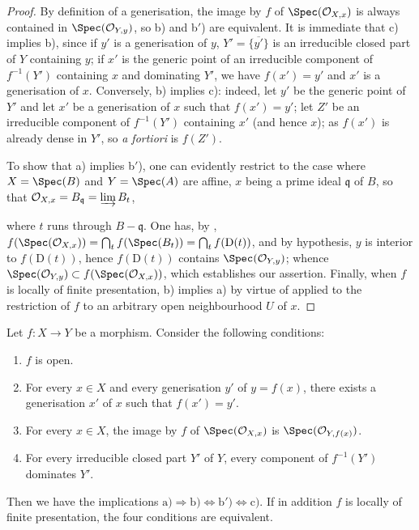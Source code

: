 
\begin{proof}
By definition of a generisation, the image by $f$ of $\Spec(\mathcal{O}_{X,x})$ is always contained in $\Spec(\mathcal{O}_{Y,y})$, so b) and b$'$) are equivalent.
It is immediate that c) implies b), since if $y'$ is a generisation of $y$, $Y'=\overline{\{y'\}}$ is an irreducible closed part of $Y$ containing $y$; if $x'$ is the generic point of an irreducible component of $f^{-1}(Y')$ containing $x$ and dominating $Y'$, we have $f(x')=y'$  and $x'$ is a generisation of $x$.
Conversely, b) implies c): indeed, let $y'$ be the generic point of $Y'$ and let $x'$ be a generisation of $x$ such that $f(x')=y'$; let $Z'$ be an irreducible component of $f^{-1}(Y')$ containing $x'$ (and hence $x$); as $f(x')$ is already dense in $Y'$, so \emph{a fortiori} is $f(Z')$.

To show that a) implies b$'$), one can evidently restrict to the case where $X=\Spec(B)$ and $Y=\Spec(A)$ are affine, $x$ being a prime ideal $\mathfrak{q}$ of $B$, so that $\mathcal{O}_{X,x}=B_\mathfrak{q}=\varinjlim B_t$,


where $t$ runs through $B-\mathfrak{q}$.
One has, by , $f(\Spec(\mathcal{O}_{X,x}))=\bigcap_t f(\Spec(B_t))=\bigcap_t f(\mathrm{D}(t))$, and by hypothesis, $y$ is interior to $f(\mathrm{D}(t))$, hence $f(\mathrm{D}(t))$ contains $\Spec(\mathcal{O}_{Y,y})$; whence $\Spec(\mathcal{O}_{Y,y})\subset f(\Spec(\mathcal{O}_{X,x}))$, which establishes our assertion.
Finally, when $f$ is locally of finite presentation, b) implies a) by virtue of  applied to the restriction of $f$ to an arbitrary open neighbourhood $U$ of $x$.
\end{proof}

\begin{corollary}[1.10.4]
\label{IV.1.10.4}
Let $f:X\to Y$ be a morphism.
Consider the following conditions:
\begin{enumerate}
  \item[\rm a)] $f$ is open.
  \item[\rm b)] For every $x\in X$ and every generisation $y'$ of $y=f(x)$, there exists a generisation $x'$ of $x$ such that $f(x')=y'$.
  \item[\rm b$'$)] For every $x\in X$, the image by $f$ of $\Spec(\mathcal{O}_{X,x})$ is $\Spec(\mathcal{O}_{Y,f(x)})$.
  \item[\rm c)] For every irreducible closed part $Y'$ of $Y$, every component of $f^{-1}(Y')$ dominates $Y'$.
\end{enumerate}
Then we have the implications $\mathrm{a)}\Rightarrow\mathrm{b)}\Leftrightarrow\mathrm{b')}\Leftrightarrow\mathrm{c)}$.
If in addition $f$ is locally of finite presentation, the four conditions are equivalent.
\end{corollary}


